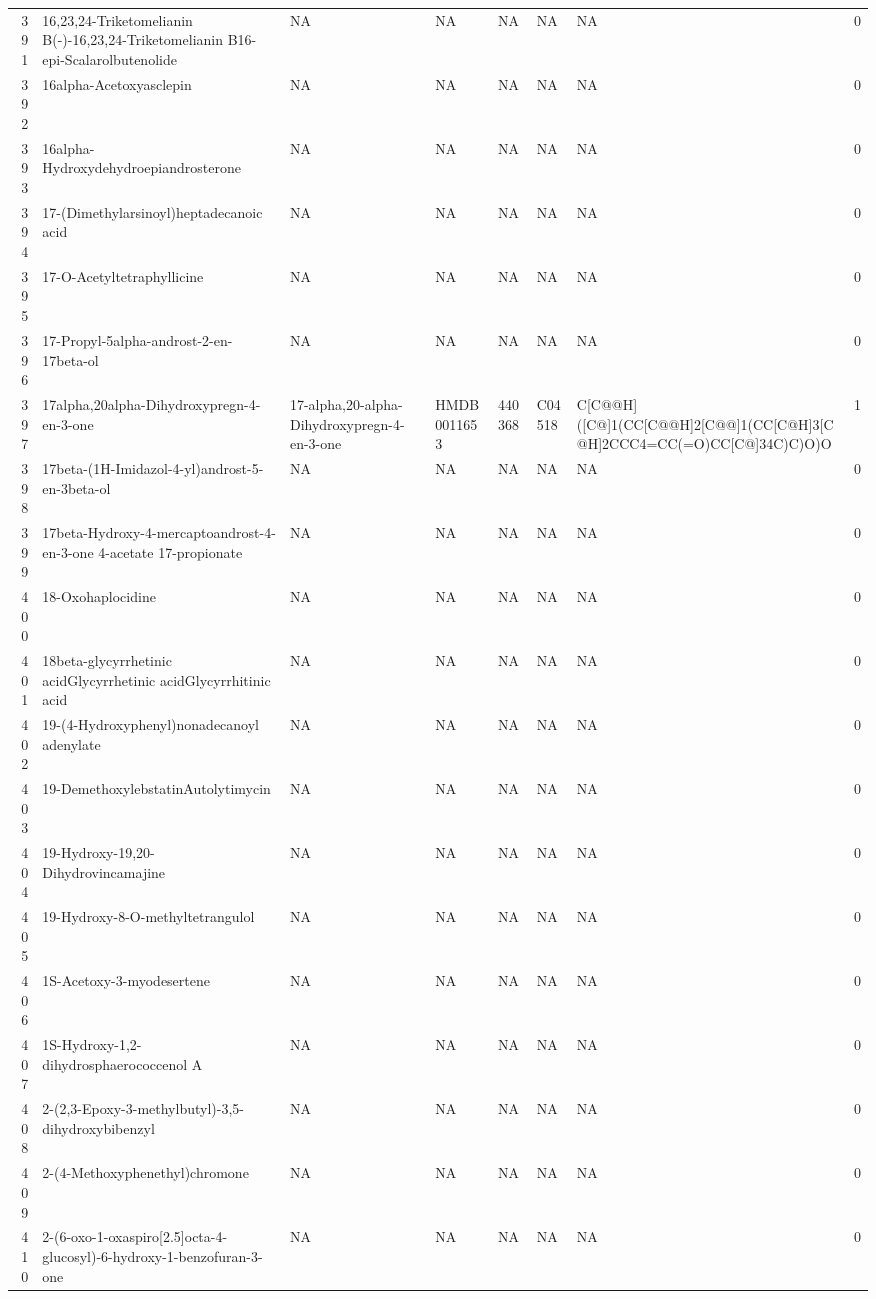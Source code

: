 \documentclass[a4paper]{article}
\begin{document}
\begin{longtable}{rlllllll}
  391 & 16,23,24-Triketomelianin B(-)-16,23,24-Triketomelianin B16-epi-Scalarolbutenolide & NA & NA & NA & NA & NA & 0 \\ 
  392 & 16alpha-Acetoxyasclepin & NA & NA & NA & NA & NA & 0 \\ 
  393 & 16alpha-Hydroxydehydroepiandrosterone & NA & NA & NA & NA & NA & 0 \\ 
  394 & 17-(Dimethylarsinoyl)heptadecanoic acid & NA & NA & NA & NA & NA & 0 \\ 
  395 & 17-O-Acetyltetraphyllicine & NA & NA & NA & NA & NA & 0 \\ 
  396 & 17-Propyl-5alpha-androst-2-en-17beta-ol & NA & NA & NA & NA & NA & 0 \\ 
  397 & 17alpha,20alpha-Dihydroxypregn-4-en-3-one & 17-alpha,20-alpha-Dihydroxypregn-4-en-3-one & HMDB0011653 & 440368 & C04518 & C[C@@H]([C@]1(CC[C@@H]2[C@@]1(CC[C@H]3[C@H]2CCC4=CC(=O)CC[C@]34C)C)O)O & 1 \\ 
  398 & 17beta-(1H-Imidazol-4-yl)androst-5-en-3beta-ol & NA & NA & NA & NA & NA & 0 \\ 
  399 & 17beta-Hydroxy-4-mercaptoandrost-4-en-3-one 4-acetate 17-propionate & NA & NA & NA & NA & NA & 0 \\ 
  400 & 18-Oxohaplocidine & NA & NA & NA & NA & NA & 0 \\ 
  401 & 18beta-glycyrrhetinic acidGlycyrrhetinic acidGlycyrrhitinic acid & NA & NA & NA & NA & NA & 0 \\ 
  402 & 19-(4-Hydroxyphenyl)nonadecanoyl adenylate & NA & NA & NA & NA & NA & 0 \\ 
  403 & 19-DemethoxylebstatinAutolytimycin & NA & NA & NA & NA & NA & 0 \\ 
  404 & 19-Hydroxy-19,20-Dihydrovincamajine & NA & NA & NA & NA & NA & 0 \\ 
  405 & 19-Hydroxy-8-O-methyltetrangulol & NA & NA & NA & NA & NA & 0 \\ 
  406 & 1S-Acetoxy-3-myodesertene & NA & NA & NA & NA & NA & 0 \\ 
  407 & 1S-Hydroxy-1,2-dihydrosphaerococcenol A & NA & NA & NA & NA & NA & 0 \\ 
  408 & 2-(2,3-Epoxy-3-methylbutyl)-3,5-dihydroxybibenzyl & NA & NA & NA & NA & NA & 0 \\ 
  409 & 2-(4-Methoxyphenethyl)chromone & NA & NA & NA & NA & NA & 0 \\ 
  410 & 2-(6-oxo-1-oxaspiro[2.5]octa-4-glucosyl)-6-hydroxy-1-benzofuran-3-one & NA & NA & NA & NA & NA & 0 \\ 

\end{longtable}
\end{document}
